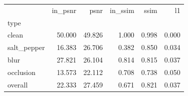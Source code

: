 \begin{tabular}{lrrrrr}
\toprule
 & in_psnr & psnr & in_ssim & ssim & l1 \\
type &  &  &  &  &  \\
\midrule
clean & 50.000 & 49.826 & 1.000 & 0.998 & 0.000 \\
salt_pepper & 16.383 & 26.706 & 0.382 & 0.850 & 0.034 \\
blur & 27.821 & 26.104 & 0.814 & 0.815 & 0.037 \\
occlusion & 13.573 & 22.112 & 0.708 & 0.738 & 0.050 \\
overall & 22.333 & 27.459 & 0.671 & 0.821 & 0.037 \\
\bottomrule
\end{tabular}
